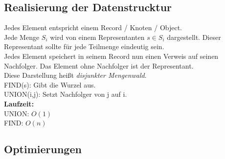 \subsection{Realisierung der Datenstrucktur}

Jedes Element entspricht einem Record / Knoten / Object.\\

Jede Menge $S_i$ wird von einem Representanten $s \in S_i$ dargestellt. Dieser Representant sollte für jede Teilmenge eindeutig sein.\\

Jedes Element speichert in seinem Record nun einen Verweis auf seinen Nachfolger. Das Element ohne Nachfolger ist der Representant.\\

Diese Darstellung heißt \emph{disjunkter Mengenwald}.\\
FIND(s): Gibt die Wurzel aus.\\
UNION(i,j): Setzt Nachfolger von j auf i.\\

\textbf{Laufzeit:}\\
UNION: $O(1)$\\
FIND: $O(n)$

\subsection{Optimierungen}

